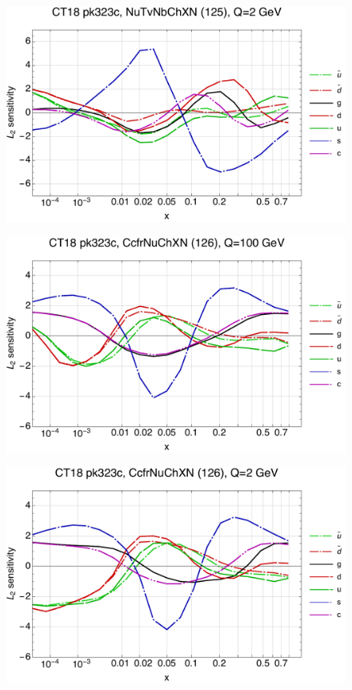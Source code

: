 \documentclass[10pt,aps,prd,floatfix,titlepage]{revtex4}
\begin{document}
\begin{figure}
\includegraphics[width=\textwidth,height=0.44\textheight,keepaspectratio]{1/125_ct18nn_L2_q2_Sf_1.pdf}
\caption{}
\end{figure}
\clearpage
\begin{figure}
\includegraphics[width=\textwidth,height=0.44\textheight,keepaspectratio]{1/126_ct18nn_L2_q100_Sf_1.pdf}
\caption{}
\end{figure}
\begin{figure}
\includegraphics[width=\textwidth,height=0.44\textheight,keepaspectratio]{1/126_ct18nn_L2_q2_Sf_1.pdf}
\caption{}
\end{figure}
\end{document}
